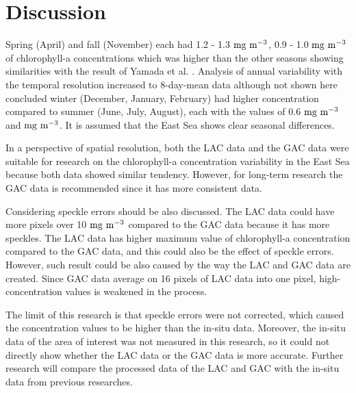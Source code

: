 \section{Discussion}

Spring (April) and fall (November) each had 1.2 - 1.3 $\rm mg~m^{-3}$, 0.9 - 1.0 $\rm mg~m^{-3}$ of chlorophyll-a concentrations which was higher than the other seasons showing similarities with the result of Yamada et al. \cite{yamada2004seasonal}. Analysis of annual variability with the temporal resolution increased to 8-day-mean data although not shown here concluded winter (December, January, February) had higher concentration compared to summer (June, July, August), each with the values of 0.6 $\rm mg~m^{-3}$ and $\rm mg~m^{-3}$. It is assumed that the East Sea shows clear seasonal differences.

In a perspective of spatial resolution, both the LAC data and the GAC data were suitable for research on the chlorophyll-a concentration variability in the East Sea because both data showed similar tendency. However, for long-term research the GAC data is recommended since it has more consistent data. 

Considering speckle errors should be also discussed. The LAC data could have more pixels over 10 $\rm mg~m^{-3}$ compared to the GAC data because it has more speckles. The LAC data has higher maximum value of chlorophyll-a concentration compared to the GAC data, and this could also be the effect of speckle errors. However, such result could be also caused by the way the LAC and GAC data are created. Since GAC data average on 16 pixels of LAC data into one pixel, high-concentration values is weakened in the process. 

The limit of this research is that speckle errors were not corrected, which caused the concentration values to be higher than the in-situ data. Moreover, the in-situ data of the area of interest was not measured in this research, so it could not directly show whether the LAC data or the GAC data is more accurate. Further research will compare the processed data of the LAC and GAC with the in-situ data from previous researches.

